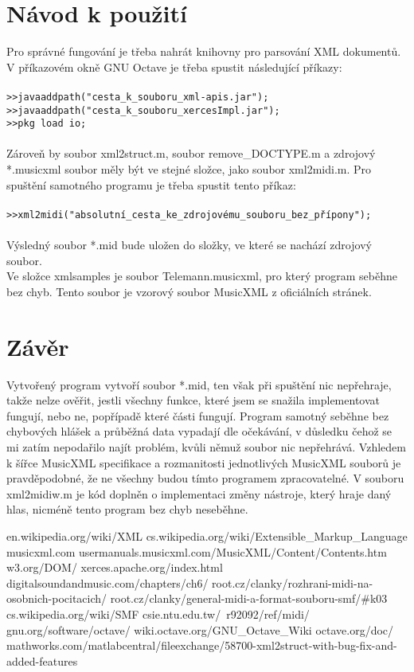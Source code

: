 \documentclass[12pt,a4paper,titlepage]{article}
\begin{document}
\section{Návod k použití}
Pro správné fungování je třeba nahrát knihovny pro parsování XML dokumentů. 
V příkazovém okně GNU Octave je třeba spustit následující příkazy:\\
\\
\texttt{>>javaaddpath("cesta\_k\_souboru\_xml-apis.jar");\\
>>javaaddpath("cesta\_k\_souboru\_xercesImpl.jar");\\
>>pkg load io;}\\
\\
Zároveň by soubor xml2struct.m, soubor remove\_DOCTYPE.m a zdrojový *.musicxml soubor měly být ve stejné složce, jako soubor xml2midi.m.
Pro spuštění samotného programu je třeba spustit tento příkaz:\\
\\
\texttt{>>xml2midi("absolutní\_cesta\_ke\_zdrojovému\_souboru\_bez\_přípony");}\\
\\
Výsledný soubor *.mid bude uložen do složky, ve které se nachází zdrojový soubor.\\
Ve složce xmlsamples je soubor Telemann.musicxml, pro který program seběhne bez chyb. Tento soubor je vzorový soubor MusicXML z oficiálních stránek\cite{mxml}. 
\section{Závěr}
Vytvořený program vytvoří soubor *.mid, ten však při spuštění nic nepřehraje, takže nelze ověřit, jestli všechny funkce, které jsem se snažila implementovat fungují, nebo ne, popřípadě které části fungují. Program samotný seběhne bez chybových hlášek a průběžná data vypadají dle očekávání, v důsledku čehož se mi zatím nepodařilo najít problém, kvůli němuž soubor nic nepřehrává. Vzhledem k šířce MusicXML specifikace a rozmanitosti jednotlivých MusicXML souborů je pravděpodobné, že ne všechny budou tímto programem zpracovatelné. V souboru xml2midiw.m je kód doplněn o implementaci změny nástroje, který hraje daný hlas, nicméně tento program bez chyb neseběhne.
\newpage
{}
\begin{thebibliography}{20}
en.wikipedia.org/wiki/XML
cs.wikipedia.org/wiki/Extensible\_Markup\_Language
musicxml.com
usermanuals.musicxml.com/MusicXML/Content/Contents.htm
w3.org/DOM/
xerces.apache.org/index.html
digitalsoundandmusic.com/chapters/ch6/
root.cz/clanky/rozhrani-midi-na-osobnich-pocitacich/
root.cz/clanky/general-midi-a-format-souboru-smf/\#k03
cs.wikipedia.org/wiki/SMF
csie.ntu.edu.tw/~r92092/ref/midi/
gnu.org/software/octave/
wiki.octave.org/GNU\_Octave\_Wiki
octave.org/doc/
mathworks.com/matlabcentral/fileexchange/58700-xml2struct-with-bug-fix-and-added-features
\end{thebibliography}
\end{document}
